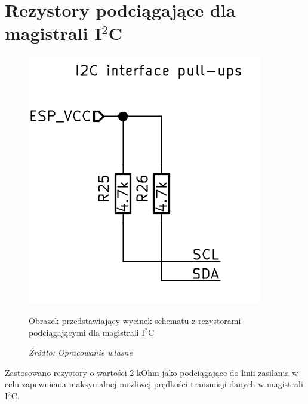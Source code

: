 \documentclass[12pt,a4paper,oneside]{memoir}
\begin{document}
\section{Rezystory podciągające dla magistrali I$^2$C}
\begin{figure}[!h]
	\centering
	\includegraphics[scale=0.25]{images/sch/sch-09.png}
	{\tytulyrozdzialow \footnotesize \caption[Schemat - rezystory interfejsu I$^2$C] {Obrazek przedstawiający wycinek schematu z rezystorami podciągającymi dla magistrali I$^2$C}}
	\caption*{\textit{Źródło: Opracowanie własne}}
\end{figure}
\par Zastosowano rezystory o wartości 2 kOhm jako podciągające do linii zasilania w celu zapewnienia maksymalnej możliwej prędkości transmisji danych w magistrali I$^2$C.
\newpage
\end{document}
